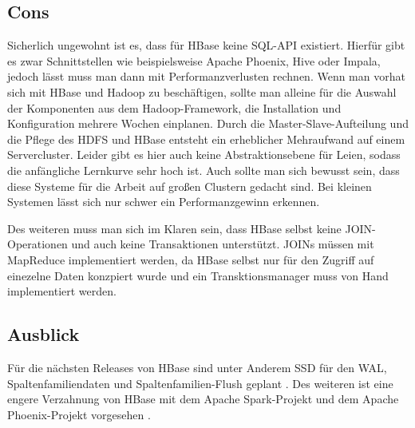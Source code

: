 %


\subsection{Cons}
Sicherlich ungewohnt ist es, dass für HBase keine SQL-API existiert. Hierfür gibt es zwar Schnittstellen wie beispielsweise Apache Phoenix, Hive oder Impala, jedoch lässt muss man dann mit Performanzverlusten rechnen. 
 Wenn man vorhat sich mit HBase und Hadoop zu beschäftigen, sollte man alleine für die Auswahl der Komponenten aus dem Hadoop-Framework, die Installation und Konfiguration mehrere Wochen einplanen. Durch die Master-Slave-Aufteilung und die Pflege des \ac{HDFS} und HBase entsteht ein erheblicher Mehraufwand auf einem Servercluster. Leider gibt es hier auch keine Abstraktionsebene für Leien, sodass die anfängliche Lernkurve sehr hoch ist. Auch sollte man sich bewusst sein, dass diese Systeme für die Arbeit auf großen Clustern gedacht sind. Bei kleinen Systemen lässt sich nur schwer ein Performanzgewinn erkennen.

Des weiteren muss man sich im Klaren sein, dass HBase selbst keine JOIN-Operationen und auch keine Transaktionen unterstützt. JOINs müssen mit MapReduce implementiert werden, da HBase selbst nur für den Zugriff auf einezelne Daten konzpiert wurde und ein Transktionsmanager muss von Hand implementiert werden.

\subsection{Ausblick}
Für die nächsten Releases von HBase sind unter Anderem SSD für den \ac{WAL}, Spaltenfamiliendaten und Spaltenfamilien-Flush geplant \cite{en15}. Des weiteren ist eine engere Verzahnung von HBase mit dem Apache Spark-Projekt \cite{youspark} und dem Apache Phoenix-Projekt vorgesehen \cite{en16}.


